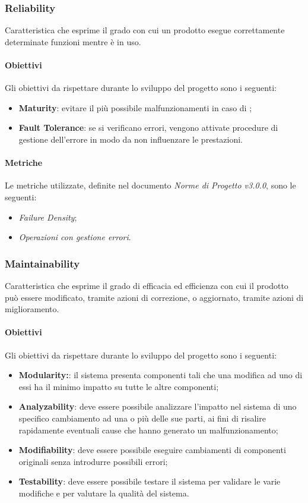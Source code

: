 \subsubsection{Reliability} 
	Caratteristica che esprime il grado con cui un prodotto esegue correttamente determinate funzioni  mentre è in uso.
\paragraph{Obiettivi} \Spazio
Gli obiettivi da rispettare durante lo sviluppo del progetto sono i seguenti:
	\begin{itemize}
		\item{\textbf{Maturity}: evitare il più possibile malfunzionamenti in caso di ;
		}
		\item{\textbf{Fault Tolerance}: se si verificano errori, vengono attivate procedure di gestione dell'errore in modo da non influenzare le prestazioni.
		}
	\end{itemize}

\paragraph{Metriche} \Spazio
Le metriche utilizzate, definite nel documento \emph{Norme di Progetto v3.0.0}, sono le seguenti:
	\begin{itemize}
		\item{\emph{Failure Density};}
		\item{\emph{Operazioni con gestione errori}.}
	\end{itemize}

\subsubsection{Maintainability} 
	Caratteristica che esprime il grado di efficacia ed efficienza con cui il prodotto può essere modificato, tramite azioni di correzione, o aggiornato, tramite azioni di miglioramento.
\paragraph{Obiettivi} \Spazio
Gli obiettivi da rispettare durante lo sviluppo del progetto sono i seguenti:
	\begin{itemize}
		\item{\textbf{Modularity:}: il sistema presenta componenti tali che una modifica ad uno di essi ha il minimo impatto su tutte le altre componenti;
		}
		\item{\textbf{Analyzability}: deve essere possibile analizzare l'impatto nel sistema di uno specifico cambiamento ad una o più delle sue parti, ai fini
		di risalire rapidamente eventuali cause che hanno generato un malfunzionamento;
 		}
		\item{\textbf{Modifiability}: deve essere possibile eseguire cambiamenti di componenti originali senza introdurre possibili errori;
		}
		\item{\textbf{Testability}: deve essere possibile testare il sistema per validare le varie modifiche e per valutare la qualità del sistema.
		}
	\end{itemize}

